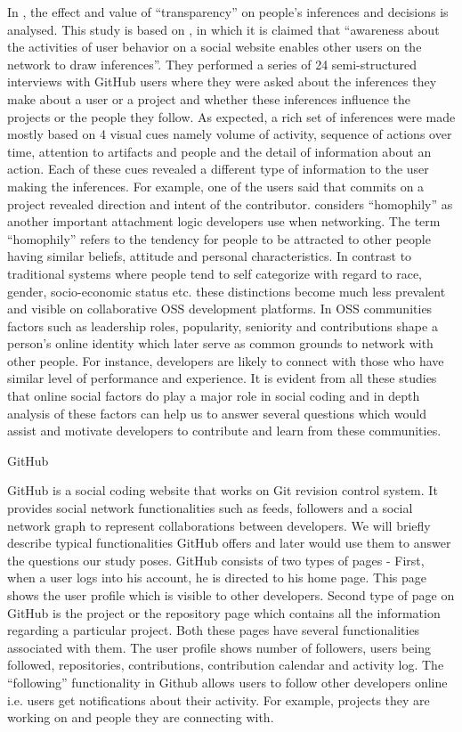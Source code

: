 In \cite{Dabbish2012}, the effect and value of ``transparency'' on people's inferences and decisions is analysed. This study is based on \cite{weiner2013}, in which it is claimed that ``awareness about the activities of user behavior on a social website enables other users on the network to draw inferences''. They performed a series of 24 semi-structured interviews with GitHub users where they were asked about the inferences they make about a user or a project and whether these inferences influence the projects or the people they follow. As expected, a rich set of inferences were made mostly based on 4 visual cues namely volume of activity, sequence of actions over time, attention to artifacts and people and the detail of information about an action. Each of these cues revealed a different type of information to the user making the inferences. For example, one of the users said that commits on a project revealed direction and intent of the contributor. \cite{Shen2011} considers ``homophily'' as another important attachment logic developers use when networking. The term ``homophily'' refers to the tendency for people to be attracted to other people having similar beliefs, attitude and personal characteristics. In contrast to traditional systems where people tend to self categorize with regard to race, gender, socio-economic status etc. these distinctions become much less prevalent and visible on collaborative OSS development platforms. In OSS communities factors such as leadership roles, popularity, seniority and contributions shape a person's online identity which later serve as common grounds to network with other people. For instance, developers are likely to connect with those who have similar level of performance and experience. It is evident from all these studies that online social factors do play a major role in social coding and in depth analysis of these factors can help us to answer several questions which would assist and motivate developers to contribute and learn from these communities.

GitHub 

GitHub \cite{GitHub} is a social coding website that works on Git revision control system. It provides social network functionalities such as feeds, followers and a social network graph to represent collaborations between developers. We will briefly describe typical functionalities GitHub offers and later would use them to answer the questions our study poses. GitHub consists of two types of pages - First, when a user logs into his account, he is directed to his home page. This page shows the user profile which is visible to other developers. Second type of page on GitHub is the project or the repository page which contains all the information regarding a particular project. Both these pages have several functionalities associated with them. The user profile shows number of followers, users being followed, repositories, contributions, contribution calendar and activity log. The ``following'' functionality in Github allows users to follow other developers online i.e. users get notifications about their activity. For example, projects they are working on and people they are connecting with.

